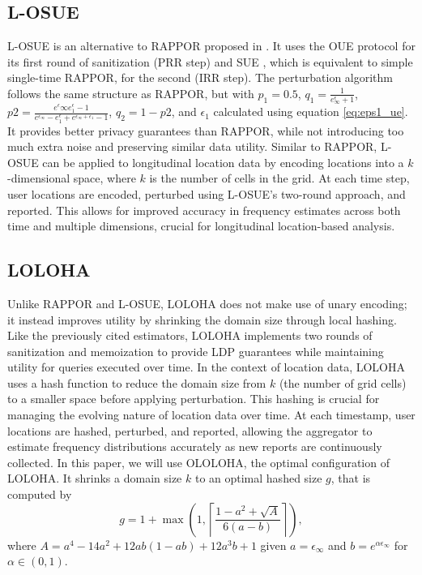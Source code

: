 \subsection{L-OSUE}
\label{sec:losue}

L-OSUE is an alternative to RAPPOR proposed in \cite{arcolezi2022improving}. It uses the OUE \cite{8253434} protocol for its first round of sanitization (PRR step) and SUE \cite{de2020protecting}, which is equivalent to simple single-time RAPPOR, for the second (IRR step). The perturbation algorithm follows the same structure as RAPPOR, but with $p_1 =0.5$, $q_1 = \frac{1}{e^\epsilon_{\infty} + 1}$, $p2=\frac{e^\epsilon\infty e^\epsilon_1-1}{e^{\epsilon_\infty} - e^\epsilon_1+e^{\epsilon_\infty +\epsilon_1}-1}$, $q_2=1-p2$, and $\epsilon_1$ calculated using equation \ref{eq:eps1_ue}. It provides better privacy guarantees than RAPPOR, while not introducing too much extra noise and preserving similar data utility. Similar to RAPPOR, L-OSUE can be applied to longitudinal location data by encoding locations into a $k$-dimensional space, where $k$ is the number of cells in the grid.  At each time step, user locations are encoded, perturbed using L-OSUE's two-round approach, and reported. This allows for improved accuracy in frequency estimates across both time and multiple dimensions, crucial for longitudinal location-based analysis.

\subsection{LOLOHA}
\label{sec:loloha}

Unlike RAPPOR and L-OSUE, LOLOHA \citep{arcolezi2022frequency} does not make use of unary encoding; it instead improves utility by shrinking the domain size through local hashing. Like the previously cited estimators, LOLOHA implements two rounds of sanitization and memoization to provide LDP guarantees while maintaining utility for queries executed over time.  In the context of location data, LOLOHA uses a hash function to reduce the domain size from $k$ (the number of grid cells) to a smaller space before applying perturbation. This hashing is crucial for managing the evolving nature of location data over time. At each timestamp, user locations are hashed, perturbed, and reported, allowing the aggregator to estimate frequency distributions accurately as new reports are continuously collected. In this paper, we will use OLOLOHA, the optimal configuration of LOLOHA. It shrinks a domain size $k$ to an optimal hashed size $g$, that is computed by 
% 
\begin{equation}
g = 1 + \max\left(1, \left\lceil \frac{1 - a^2 + \sqrt{A}}{6(a - b)} \right\rceil \right),
\label{eq:ololoha_g}
\end{equation}
where $A = a^4 - 14a^2 + 12ab(1 - ab) + 12a^3b + 1$ given $a = \epsilon_{\infty}$ and $b = e^{\alpha\epsilon_{\infty}}$ for $\alpha \in (0, 1)$.

